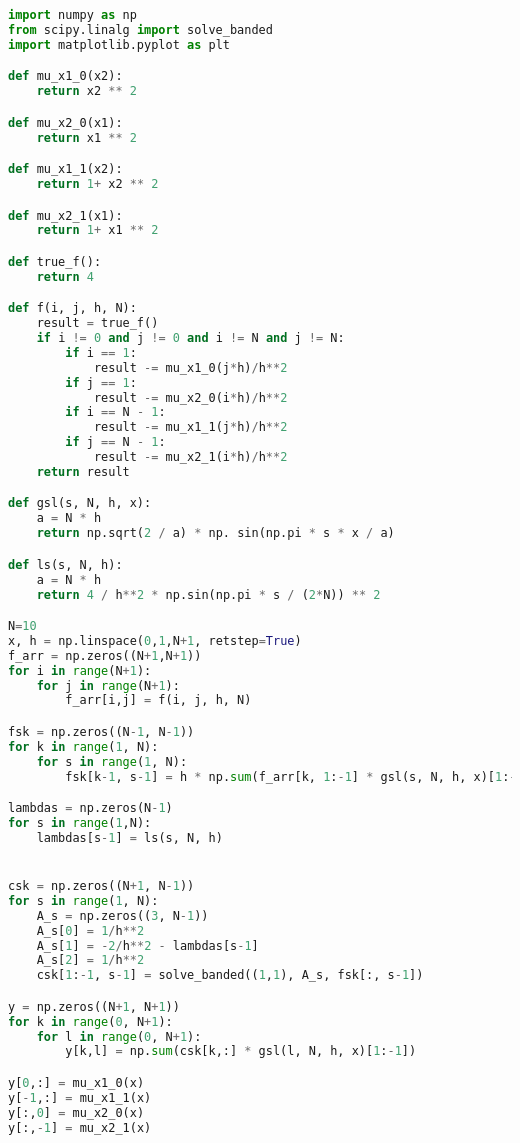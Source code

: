 \newpage

\begin{lstlisting}[language=Python, caption=Реализация метода Фурье на языке Python, label=foir]
import numpy as np
from scipy.linalg import solve_banded
import matplotlib.pyplot as plt

def mu_x1_0(x2):
    return x2 ** 2

def mu_x2_0(x1):
    return x1 ** 2

def mu_x1_1(x2):
    return 1+ x2 ** 2

def mu_x2_1(x1):
    return 1+ x1 ** 2

def true_f():
    return 4

def f(i, j, h, N):
    result = true_f()
    if i != 0 and j != 0 and i != N and j != N:
        if i == 1:
            result -= mu_x1_0(j*h)/h**2
        if j == 1:
            result -= mu_x2_0(i*h)/h**2
        if i == N - 1:
            result -= mu_x1_1(j*h)/h**2
        if j == N - 1:
            result -= mu_x2_1(i*h)/h**2
    return result

def gsl(s, N, h, x):
    a = N * h
    return np.sqrt(2 / a) * np. sin(np.pi * s * x / a)

def ls(s, N, h):
    a = N * h
    return 4 / h**2 * np.sin(np.pi * s / (2*N)) ** 2

N=10
x, h = np.linspace(0,1,N+1, retstep=True)
f_arr = np.zeros((N+1,N+1))
for i in range(N+1):
    for j in range(N+1):
        f_arr[i,j] = f(i, j, h, N)

fsk = np.zeros((N-1, N-1))
for k in range(1, N):
    for s in range(1, N):
        fsk[k-1, s-1] = h * np.sum(f_arr[k, 1:-1] * gsl(s, N, h, x)[1:-1])

lambdas = np.zeros(N-1)
for s in range(1,N):
    lambdas[s-1] = ls(s, N, h)


csk = np.zeros((N+1, N-1))
for s in range(1, N):
    A_s = np.zeros((3, N-1))
    A_s[0] = 1/h**2
    A_s[1] = -2/h**2 - lambdas[s-1]
    A_s[2] = 1/h**2
    csk[1:-1, s-1] = solve_banded((1,1), A_s, fsk[:, s-1])

y = np.zeros((N+1, N+1))
for k in range(0, N+1):
    for l in range(0, N+1):
        y[k,l] = np.sum(csk[k,:] * gsl(l, N, h, x)[1:-1])

y[0,:] = mu_x1_0(x)
y[-1,:] = mu_x1_1(x)
y[:,0] = mu_x2_0(x)
y[:,-1] = mu_x2_1(x)
\end{lstlisting}
